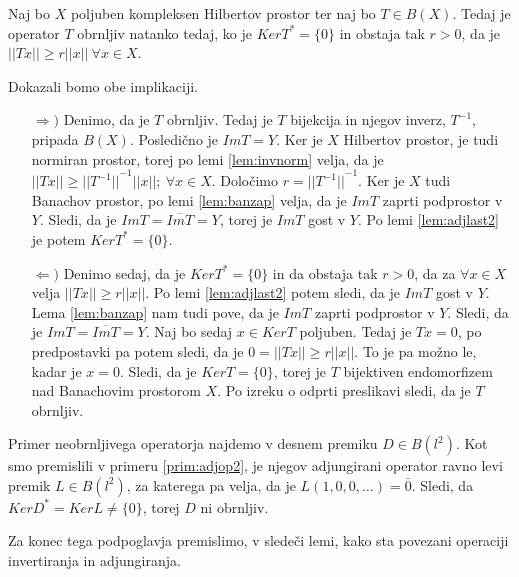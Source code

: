 \documentclass[mat2]{matdelo}
\newcommand{\abs}[1]{\ensuremath{\lvert #1 \rvert}}
\newcommand{\norm}[1]{\abs{\abs{#1}}}
\begin{document}
			\begin{posledica}
				\label{posl:adjinv}
				Naj bo $X$ poljuben kompleksen Hilbertov prostor ter naj bo $T\in B(X)$. Tedaj je operator $T$ obrnljiv natanko tedaj, ko je $KerT^* = \{0\}$ in obstaja tak $r > 0$, da je $\norm{Tx} \geq r\norm{x}~\forall x\in X$.
			\end{posledica}
			
			\begin{dokaz}
				Dokazali bomo obe implikaciji.
				\begin{itemize}
					\item[$\Rightarrow)$] Denimo, da je $T$ obrnljiv. Tedaj je $T$ bijekcija in njegov inverz, $T^{-1}$, pripada $B(X)$. Posledično je $ImT = Y$. Ker je $X$ Hilbertov prostor, je tudi normiran prostor, torej po lemi \ref{lem:invnorm} velja, da je $\norm{Tx}\geq \norm{T^{-1}}^{-1}\norm{x};~\forall x\in X$. Določimo $r = \norm{T^{-1}}^{-1}$. Ker je $X$ tudi Banachov prostor, po lemi \ref{lem:banzap} velja, da je $ImT$ zaprti podprostor v $Y$. Sledi, da je $ImT = \overline{ImT} = Y$, torej je $ImT$ gost v $Y$. Po lemi \ref{lem:adjlast2} je potem $KerT^* = \{0\}$.
					\item[$\Leftarrow)$] Denimo sedaj, da je $KerT^* = \{0\}$ in da obstaja tak $r>0$, da za $\forall x\in X$ velja $\norm{Tx} \geq r\norm{x}$. Po lemi \ref{lem:adjlast2} potem sledi, da je $ImT$ gost v $Y$. Lema \ref{lem:banzap} nam tudi pove, da je $ImT$ zaprti podprostor v $Y$. Sledi, da je $ImT = \overline{ImT} = Y$.
					Naj bo sedaj $x\in KerT$ poljuben. Tedaj je $Tx = 0$, po predpostavki pa potem sledi, da je $0 = \norm{Tx} \geq r\norm{x}$. To je pa možno le, kadar je $x = 0$. Sledi, da je $KerT = \{0\}$, torej je $T$ bijektiven endomorfizem nad Banachovim prostorom $X$. Po izreku o odprti preslikavi sledi, da je $T$ obrnljiv.
				\end{itemize}
			\end{dokaz}
			
			\begin{primer}
				\label{prim:adjinv}
				Primer neobrnljivega operatorja najdemo v desnem premiku $D\in B(l^2)$. Kot smo premislili v primeru \ref{prim:adjop2}, je njegov adjungirani operator ravno levi premik $L\in B(l^2)$, za katerega pa velja, da je $L(1, 0, 0, \ldots) = \bar{0}$. Sledi, da $KerD^* = KerL \neq \{0\}$, torej $D$ ni obrnljiv.
			\end{primer}
			
			Za konec tega podpoglavja premislimo, v sledeči lemi, kako sta povezani operaciji invertiranja in adjungiranja.
			
\end{document}
